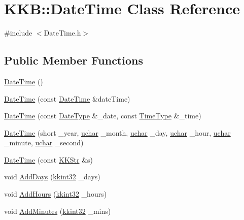 \hypertarget{class_k_k_b_1_1_date_time}{}\section{K\+KB\+:\+:Date\+Time Class Reference}
\label{class_k_k_b_1_1_date_time}


{\ttfamily \#include $<$Date\+Time.\+h$>$}

\subsection*{Public Member Functions}
\begin{DoxyCompactItemize}
\item 
\hyperlink{class_k_k_b_1_1_date_time_a3ccfb87f7a2e9683b91964e32d907161}{Date\+Time} ()
\item 
\hyperlink{class_k_k_b_1_1_date_time_a147e3ba552c01109b1327624d6aed70b}{Date\+Time} (const \hyperlink{class_k_k_b_1_1_date_time}{Date\+Time} \&date\+Time)
\item 
\hyperlink{class_k_k_b_1_1_date_time_af93fc54efb1e1daa33c1ffe79d5f78bb}{Date\+Time} (const \hyperlink{class_k_k_b_1_1_date_type}{Date\+Type} \&\+\_\+date, const \hyperlink{class_k_k_b_1_1_time_type}{Time\+Type} \&\+\_\+time)
\item 
\hyperlink{class_k_k_b_1_1_date_time_a08a9a2435a6b3474017d4b4cddbdcc6d}{Date\+Time} (short \+\_\+year, \hyperlink{namespace_k_k_b_ace9969169bf514f9ee6185186949cdf7}{uchar} \+\_\+month, \hyperlink{namespace_k_k_b_ace9969169bf514f9ee6185186949cdf7}{uchar} \+\_\+day, \hyperlink{namespace_k_k_b_ace9969169bf514f9ee6185186949cdf7}{uchar} \+\_\+hour, \hyperlink{namespace_k_k_b_ace9969169bf514f9ee6185186949cdf7}{uchar} \+\_\+minute, \hyperlink{namespace_k_k_b_ace9969169bf514f9ee6185186949cdf7}{uchar} \+\_\+second)
\item 
\hyperlink{class_k_k_b_1_1_date_time_a5685c4e77778d570f3e14149bc2bb970}{Date\+Time} (const \hyperlink{class_k_k_b_1_1_k_k_str}{K\+K\+Str} \&s)
\item 
void \hyperlink{class_k_k_b_1_1_date_time_a285f607b8d42745d661a76530192a5fa}{Add\+Days} (\hyperlink{namespace_k_k_b_a8fa4952cc84fda1de4bec1fbdd8d5b1b}{kkint32} \+\_\+days)
\item 
void \hyperlink{class_k_k_b_1_1_date_time_aa00751cde5c47424833acef065629adf}{Add\+Hours} (\hyperlink{namespace_k_k_b_a8fa4952cc84fda1de4bec1fbdd8d5b1b}{kkint32} \+\_\+hours)
\item 
void \hyperlink{class_k_k_b_1_1_date_time_a7621802a3441ba13250536f60ce26ba8}{Add\+Minutes} (\hyperlink{namespace_k_k_b_a8fa4952cc84fda1de4bec1fbdd8d5b1b}{kkint32} \+\_\+mins)

\end{DoxyCompactItemize}
